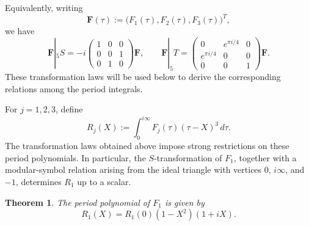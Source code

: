 \documentclass[preprint,12pt]{elsarticle}
\newtheorem{theorem}{Theorem}[section]
\theoremstyle{definition}
\theoremstyle{remark}
\begin{document}
Equivalently, writing
\[
\mathbf F(\tau):=\bigl(F_1(\tau),F_2(\tau),F_3(\tau)\bigr)^T,
\]
we have
\[
\mathbf F|_5S=-i
\begin{pmatrix}
	1&0&0\\
	0&0&1\\
	0&1&0
\end{pmatrix}\mathbf F,
\qquad
\mathbf F|_5T=
\begin{pmatrix}
	0&e^{\pi i/4}&0\\
	e^{\pi i/4}&0&0\\
	0&0&1
\end{pmatrix}\mathbf F.
\]
These transformation laws will be used below to derive the corresponding relations among the period integrals.

For $j=1,2,3$, define
	\[
	R_j(X):=\int_0^{i\infty}F_j(\tau)(\tau-X)^3\,d\tau.
	\]
	The transformation laws obtained above impose strong restrictions on these period polynomials.  In particular, the $S$-transformation of $F_1$, together with a modular-symbol relation arising from the ideal triangle with vertices $0$, $i\infty$, and $-1$, determines $R_1$ up to a scalar.
	
	\begin{theorem}
		The period polynomial of $F_1$ is given by
		\[
		R_1(X)=R_1(0)(1-X^2)(1+iX).
		\]
	\end{theorem}
	
\end{document}
